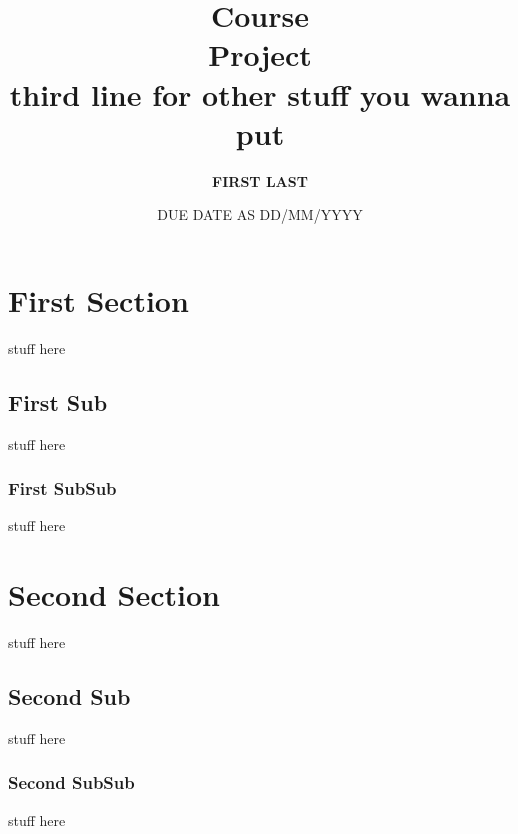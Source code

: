 \documentclass{article}
\begin{document}
\title{ \textbf{{}  Course} \\ Project \\ third line for other stuff you wanna put}
\author{\textbf{FIRST LAST}}
\date{DUE DATE AS DD/MM/YYYY}
\maketitle

\newpage
\tableofcontents
\newpage

\section{First Section}
stuff here

\subsection{First Sub}
stuff here

\subsubsection{First SubSub}
stuff here

\newpage
\section{Second Section}
stuff here

\subsection{Second Sub}
stuff here

\subsubsection{Second SubSub}
stuff here
\end{document}
